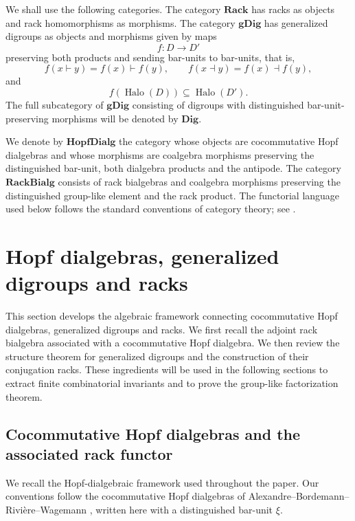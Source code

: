 \documentclass[11pt]{article}
\theoremstyle{plain}
\theoremstyle{definition}
\theoremstyle{remark}
\DeclareMathOperator{\Halo}{Halo}
\begin{document}
	We shall use the following categories. The category \(\mathbf{Rack}\) has racks
	as objects and rack homomorphisms as morphisms. The category \(\mathbf{gDig}\)
	has generalized digroups as objects and morphisms given by maps
	\[
	f:D\longrightarrow D'
	\]
	preserving both products and sending bar-units to bar-units, that is,
	\[
	f(x\vdash y)=f(x)\vdash f(y),\qquad
	f(x\dashv y)=f(x)\dashv f(y),
	\]
	and
	\[
	f(\Halo(D))\subseteq \Halo(D').
	\]
	The full subcategory of \(\mathbf{gDig}\) consisting of digroups with
	distinguished bar-unit-preserving morphisms will be denoted by \(\mathbf{Dig}\).
	
	We denote by \(\mathbf{HopfDialg}\) the category whose objects are
	cocommutative Hopf dialgebras and whose morphisms are coalgebra morphisms
	preserving the distinguished bar-unit, both dialgebra products and the
	antipode. The category \(\mathbf{RackBialg}\) consists of rack bialgebras and
	coalgebra morphisms preserving the distinguished group-like element and the
	rack product. The functorial language used below follows the standard
	conventions of category theory; see \cite[Chapter~I]{MacLane1998}.
	
	\section{Hopf dialgebras, generalized digroups and racks}
	
	This section develops the algebraic framework connecting cocommutative Hopf
	dialgebras, generalized digroups and racks. We first recall the adjoint rack
	bialgebra associated with a cocommutative Hopf dialgebra. We then review the
	structure theorem for generalized digroups and the construction of their
	conjugation racks. These ingredients will be used in the following sections to
	extract finite combinatorial invariants and to prove the group-like
	factorization theorem.
	
	\subsection{Cocommutative Hopf dialgebras and the associated rack functor}
	
	We recall the Hopf-dialgebraic framework used throughout the paper. Our
	conventions follow the cocommutative Hopf dialgebras of
	Alexandre--Bordemann--Rivi\`ere--Wagemann \cite{ABRW1}, written here with a
	distinguished bar-unit \(\xi\).
	
\end{document}
